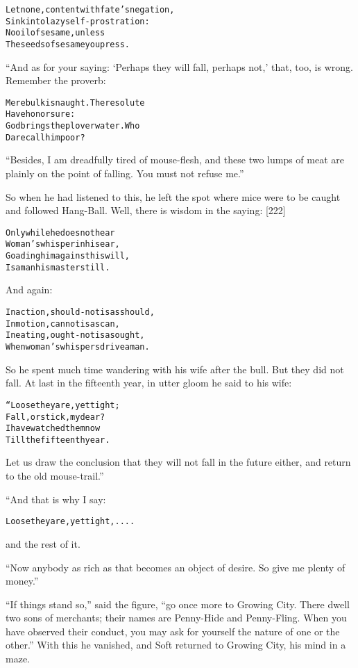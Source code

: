 \documentclass{article}
\renewenvironment{verbatim}{\begin{alltt}\normalfont\begin{centering}}{\end{centering}\end{alltt}}
\begin{document}
\begin{verbatim}
Let none, content with fate's negation,
Sink into lazy self-prostration:
No oil of sesame, unless
The seeds of sesame you press.
\end{verbatim}
“And as for your saying: `Perhaps they will fall, perhaps not,'
that, too, is wrong. Remember the proverb:

\begin{verbatim}
Mere bulk is naught. The resolute
    Have honor sure:
God brings the plover water. Who
    Dare call him poor?
\end{verbatim}
``Besides, I am dreadfully tired of mouse-flesh, and these two lumps of meat are plainly on the point of falling. You must not refuse me.''

So when he had listened to this, he left the spot where mice were
to be caught and followed Hang-Ball. Well, there is wisdom in the
saying: [222]

\begin{verbatim}
Only while he does not hear
Woman's whisper in his ear,
Goading him against his will,
Is a man his master still.
\end{verbatim}
And again:

\begin{verbatim}
In action, should-not is as should,
    In motion, cannot is as can,
In eating, ought-not is as ought,
    When woman's whispers drive a man.
\end{verbatim}
So he spent much time wandering with his wife after the bull. But
they did not fall. At last in the fifteenth year, in utter gloom he
said to his wife:

\begin{verbatim}
“Loose they are, yet tight;
    Fall, or stick, my dear?
I have watched them now
    Till the fifteenth year.
\end{verbatim}
Let us draw the conclusion that they will not fall in the future
either, and return to the old mouse-trail.”

“And that is why I say:

\begin{verbatim}
Loose they are, yet tight, ....
\end{verbatim}
and the rest of it.

``Now anybody as rich as that becomes an object of desire. So give me plenty of money.''

``If things stand so,'' said the figure,
``go once more to Growing City. There dwell two sons of merchants; their names are Penny-Hide and Penny-Fling. When you have observed their conduct, you may ask for yourself the nature of one or the other.''
With this he vanished, and Soft returned to Growing City, his mind
in a maze.
\end{document}
